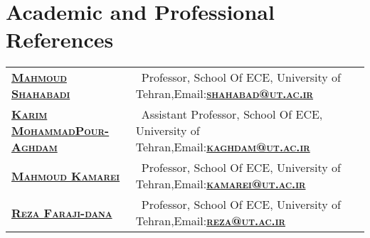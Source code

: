 \documentclass[a4paper,10pt]{article} %
\begin{document}
\section{Academic and Professional References}
\color{Black}
\begin{tabular}{ll}
		
		
		\textsc{\href{http://ece.ut.ac.ir/en/users/shahabadi}{\bf{Mahmoud Shahabadi}}}&    \  Professor, School Of ECE, University of Tehran,Email:\textsc{\href{mailto:Shahabad@ut.ac.ir}{\bf{shahabad@ut.ac.ir}}}\\
		
		\textsc{\href{http://ece.ut.ac.ir/en/users/mohammadpour}{\bf{Karim MohammadPour-Aghdam}}}&  \ Assistant Professor, School Of ECE, University of Tehran,Email:\textsc{\href{mailto:kaghdam@ut.ac.ir}{\bf{kaghdam@ut.ac.ir}}}\\
	
		\textsc{\href{http://ece.ut.ac.ir/en/users/kamarei}{\bf{Mahmoud Kamarei}}}&
		\ Professor, School Of ECE, University of Tehran,Email:\textsc{\href{mailto:kamarei@ut.ac.ir}{\bf{kamarei@ut.ac.ir}}}\\
		
		\textsc{\href{http://ece.ut.ac.ir/en/users/faraji}{\bf{Reza Faraji-dana}}}&
		    \ Professor, School Of ECE, University of Tehran,Email:\textsc{\href{mailto:reza@ut.ac.ir}{\bf{reza@ut.ac.ir}}}\\

	

			\end{tabular}
				
\end{document}

